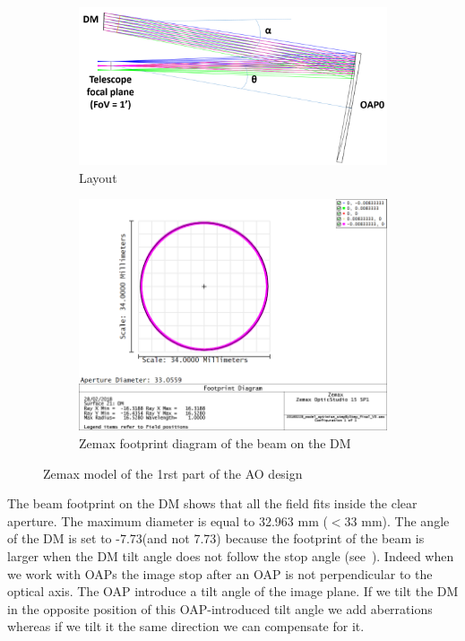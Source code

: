 \documentclass[12pt,a4paper]{article}
\begin{document}
\begin{figure}[H]
\begin{subfigure}[b]{0.45\textwidth}
	\begin{center}
		\includegraphics[width=\linewidth]{images/FP_OAP0.PNG}
		\caption{Layout}\label{fig:FP_OAP0}
	\end{center}
\end{subfigure}
\begin{subfigure}[b]{0.45\textwidth}
\begin{center}
		\includegraphics[width=\linewidth]{images/DM_beam_footprint.PNG}
		\caption{Zemax footprint diagram of the beam on the DM}\label{fig:DM_beam_footprint}
	\end{center}
\end{subfigure}
\caption{Zemax model of the 1rst part of the AO design}
\end{figure}

The beam footprint on the DM shows that all the field fits inside the clear aperture. The maximum diameter is equal to 32.963 mm ($< 33$ mm). The angle of the DM is set to -7.73\degree (and not 7.73\degree) because the footprint of the beam is larger when the DM tilt angle does not follow the stop angle (see~\cite{cite:Design90degOAP}). Indeed when we work with OAPs the image stop after an OAP is not perpendicular to the optical axis. The OAP introduce a tilt angle of the image plane. If we tilt the DM in the opposite position of this OAP-introduced tilt angle we add aberrations whereas if we tilt it the same direction we can compensate for it.
\end{document}
